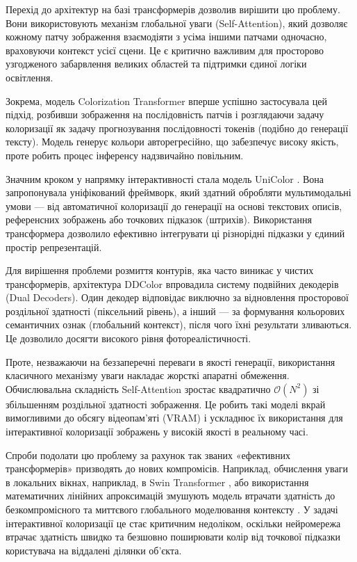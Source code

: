             Перехід до архітектур на базі трансформерів дозволив вирішити цю проблему. Вони використовують механізм глобальної уваги (Self-Attention), який дозволяє кожному патчу зображення взаємодіяти з усіма іншими патчами одночасно, враховуючи контекст усієї сцени. Це є критично важливим для просторово узгодженого забарвлення великих областей та підтримки єдиної логіки освітлення.
            
            Зокрема, модель Colorization Transformer \cite{2021-colorization-transformer} вперше успішно застосувала цей підхід, розбивши зображення на послідовність патчів і розглядаючи задачу колоризації як задачу прогнозування послідовності токенів (подібно до генерації тексту). Модель генерує кольори авторегресійно, що забезпечує високу якість, проте робить процес інференсу надзвичайно повільним.

            Значним кроком у напрямку інтерактивності стала модель UniColor \cite{2022-unicolor}. Вона запропонувала уніфікований фреймворк, який здатний обробляти мультимодальні умови --- від автоматичної колоризації до генерації на основі текстових описів, референсних зображень або точкових підказок (штрихів). Використання трансформера дозволило ефективно інтегрувати ці різнорідні підказки у єдиний простір репрезентацій.

            Для вирішення проблеми розмиття контурів, яка часто виникає у чистих трансформерів, архітектура DDColor \cite{2023-ddcolor} впровадила систему подвійних декодерів (Dual Decoders). Один декодер відповідає виключно за відновлення просторової роздільної здатності (піксельний рівень), а інший --- за формування кольорових семантичних ознак (глобальний контекст), після чого їхні результати зливаються. Це дозволило досягти високого рівня фотореалістичності.

            Проте, незважаючи на беззаперечні переваги в якості генерації, використання класичного механізму уваги накладає жорсткі апаратні обмеження. Обчислювальна складність Self-Attention зростає квадратично $\mathcal{O}(N^2)$ зі збільшенням роздільної здатності зображення. Це робить такі моделі вкрай вимогливими до обсягу відеопам'яті ($\mathrm{VRAM}$) і ускладнює їх використання для інтерактивної колоризації зображень у високій якості в реальному часі.

            Спроби подолати цю проблему за рахунок так званих «ефективних трансформерів» призводять до нових компромісів. Наприклад, обчислення уваги в локальних вікнах, наприклад, в Swin Transformer \cite{2021-swin-transformer}, або використання математичних лінійних апроксимацій змушують модель втрачати здатність до безкомпромісного та миттєвого глобального моделювання контексту \cite{2022-efficient-transformers-survey, 2021-long-range-arena}.
            У задачі інтерактивної колоризації це стає критичним недоліком, оскільки нейромережа втрачає здатність швидко та безшовно поширювати колір від точкової підказки користувача на віддалені ділянки об'єкта.
            
